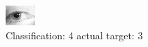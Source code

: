 \begin{figure}[h!]
\begin{center}
\includegraphics[width=0.60\columnwidth]{figures/ID1383_class_4_target_3.png}
\end{center}
\caption{ Classification: 4 actual target: 3}
\label{fig:ID1383_class_4_target_3}
\end{figure}
